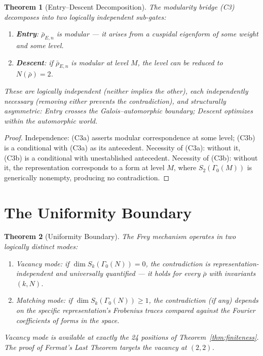 \documentclass[12pt]{amsart}
\newtheorem{theorem}{Theorem}[section]
\theoremstyle{definition}
\theoremstyle{remark}
\newcommand{\rhobar}{\bar{\rho}}
\begin{document}
\begin{theorem}[Entry--Descent Decomposition]\label{thm:entry-descent}
The modularity bridge (C3) decomposes into two logically independent sub-gates:
\begin{enumerate}[label=(C3\alph*)]
\item \textbf{Entry}: $\rhobar_{E,n}$ is modular --- it arises from a cuspidal eigenform of some weight and some level.
\item \textbf{Descent}: if $\rhobar_{E,n}$ is modular at level $M$, the level can be reduced to $N(\rhobar) = 2$.
\end{enumerate}
These are logically independent (neither implies the other), each independently necessary (removing either prevents the contradiction), and structurally asymmetric: Entry crosses the Galois--automorphic boundary; Descent optimizes within the automorphic world.
\end{theorem}

\begin{proof}
Independence: (C3a) asserts modular correspondence at some level; (C3b) is a conditional with (C3a) as its antecedent. Necessity of (C3a): without it, (C3b) is a conditional with unestablished antecedent. Necessity of (C3b): without it, the representation corresponds to a form at level $M$, where $S_2(\Gamma_0(M))$ is generically nonempty, producing no contradiction.
\end{proof}

\section{The Uniformity Boundary}
\label{sec:uniformity}

\begin{theorem}[Uniformity Boundary]\label{thm:uniformity}
The Frey mechanism operates in two logically distinct modes:
\begin{enumerate}[label=(\alph*)]
\item \emph{Vacancy mode}: if $\dim S_k(\Gamma_0(N)) = 0$, the contradiction is representation-independent and universally quantified --- it holds for every $\rhobar$ with invariants $(k, N)$.
\item \emph{Matching mode}: if $\dim S_k(\Gamma_0(N)) \geq 1$, the contradiction (if any) depends on the specific representation's Frobenius traces compared against the Fourier coefficients of forms in the space.
\end{enumerate}
Vacancy mode is available at exactly the 24 positions of Theorem~\ref{thm:finiteness}. The proof of Fermat's Last Theorem targets the vacancy at $(2, 2)$.
\end{theorem}
\end{document}
